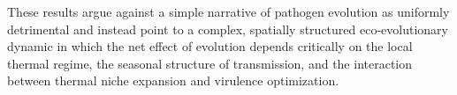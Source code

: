 \noindent
These results argue against a simple narrative of pathogen evolution as
uniformly detrimental and instead point to a complex, spatially
structured eco-evolutionary dynamic in which the net effect of
evolution depends critically on the local thermal regime, the seasonal
structure of transmission, and the interaction between thermal niche
expansion and virulence optimization.
